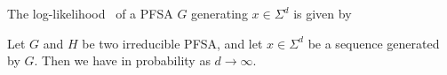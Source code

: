 \documentclass[9pt,journal]{IEEEtran}
\begin{document}
{   \begin{defn}
     \label{defn:llk}
     The log-likelihood~\cite{cover2012elements} of a PFSA $G$ generating $x\in\Sigma^{d}$ is given by
%
   \end{defn}
   \begin{thm}
 	\label{thm:llkConvergence}
     Let $G$ and $H$ be two irreducible PFSA, and let $x\in\Sigma^d$ be a sequence generated by $G$. Then we have
     in probability as $d\rightarrow\infty$.
   \end{thm}
 
}
\end{document}
